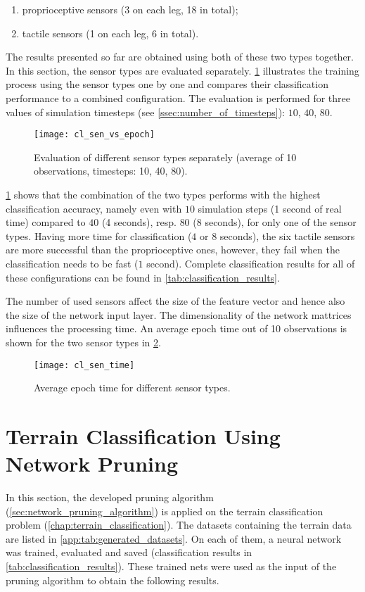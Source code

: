 \begin{enumerate}
\item proprioceptive sensors (3 on each leg, 18 in total);
\item tactile sensors (1 on each leg, 6 in total).
\end{enumerate}

The results presented so far are obtained using both of these two types together. In this section, the sensor types are evaluated separately. \cref{fig:sen_vs_epoch} illustrates the training process using the sensor types one by one and compares their classification performance to a combined configuration. The evaluation is performed for three values of simulation timesteps (see \cref{ssec:number_of_timesteps}): $ 10 $, $ 40 $, $ 80 $.

\begin{figure}[H]
  \centering
  \texttt{[image: cl\_sen\_vs\_epoch]}
  \caption{Evaluation of different sensor types separately (average of 10 observations, timesteps: 10, 40, 80).}
  \label{fig:sen_vs_epoch}
\end{figure}

\cref{fig:sen_vs_epoch} shows that the combination of the two types performs with the highest classification accuracy, namely even with $ 10 $ simulation steps (1 second of real time) compared to $ 40 $ (4 seconds), resp. $ 80 $ (8 seconds), for only one of the sensor types. Having more time for classification ($ 4 $ or $ 8 $ seconds), the six tactile sensors are more successful than the proprioceptive ones, however, they fail when the classification needs to be fast ($ 1 $ second). Complete classification results for all of these configurations can be found in \cref{tab:classification_results}.

The number of used sensors affect the size of the feature vector and hence also the size of the network input layer. The dimensionality of the network mattrices influences the processing time. An average epoch time out of 10 observations is shown for the two sensor types in \cref{fig:sen_time}. 

\begin{figure}[H]
  \centering
  \texttt{[image: cl\_sen\_time]}
  \caption{Average epoch time for different sensor types.}
  \label{fig:sen_time}
\end{figure}

\section[Terrain Classification Using Network Pruning]{Terrain Classification Using Network Pruning} \label{sec:pa_amter}
In this section, the developed pruning algorithm (\cref{sec:network_pruning_algorithm}) is applied on the terrain classification problem (\cref{chap:terrain_classification}). The datasets containing the terrain data are listed in \cref{app:tab:generated_datasets}. On each of them, a neural network was trained, evaluated and saved (classification results in \cref{tab:classification_results}). These trained nets were used as the input of the pruning algorithm to obtain the following results.

